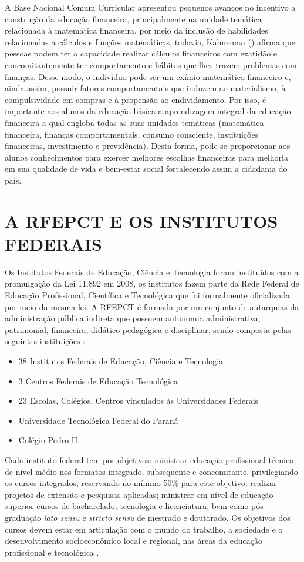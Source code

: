 A Base Nacional Comum Curricular apresentou pequenos avanços no incentivo a construção da educação financeira, principalmente na unidade temática relacionada à matemática financeira, por meio da inclusão de habilidades relacionadas a cálculos e funções matemáticas, todavia, Kahneman (\citeyear{kahneman2012}) afirma que pessoas podem ter a capacidade realizar cálculos financeiros com exatidão e concomitantemente ter comportamento e hábitos que lhes trazem problemas com finanças. Desse modo, o indivíduo pode ser um exímio matemático financeiro e, ainda assim, possuir fatores comportamentais que induzem ao materialismo, à compulsividade em compras e à propensão ao endividamento. Por isso, é importante aos alunos da educação básica a aprendizagem integral da educação financeira a qual engloba todas as suas unidades temáticas (matemática financeira, finanças comportamentais, consumo consciente, instituições financeiras, investimento e previdência). Desta forma, pode-se proporcionar aos alunos conhecimentos para exercer melhores escolhas financeiras para melhoria em sua qualidade de vida e bem-estar social fortalecendo assim a cidadania do país.

\section{A RFEPCT E OS INSTITUTOS FEDERAIS}
Os Institutos Federais de Educação, Ciência e Tecnologia foram instituídos com a promulgação da Lei 11.892 em 2008, os institutos fazem parte da Rede Federal de Educação Profissional, Científica e Tecnológica que foi formalmente oficializada por meio da mesma lei. A RFEPCT é formada por um conjunto de autarquias da administração pública indireta que possuem autonomia administrativa, patrimonial, financeira, didático-pedagógica e disciplinar, sendo composta pelas seguintes instituições \cite{brasil2008}:

\begin{itemize}
    \item 38 Institutos Federais de Educação, Ciência e Tecnologia
    \item 3 Centros Federais de Educação Tecnológica
    \item 23 Escolas, Colégios, Centros vinculados às Universidades Federais
    \item Universidade Tecnológica Federal do Paraná
    \item Colégio Pedro II
\end{itemize}

Cada instituto federal tem por objetivos: ministrar educação profissional técnica de nível médio nos formatos integrado, subsequente e concomitante, privilegiando os cursos integrados, reservando no mínimo 50\% para este objetivo; realizar projetos de extensão e pesquisas aplicadas; ministrar em nível de educação superior cursos de bacharelado, tecnologia e licenciatura, bem como pós-graduação \textit{lato sensu} e \textit{stricto sensu} de mestrado e doutorado. Os objetivos dos cursos devem estar em articulação com o mundo do trabalho, a sociedade e o desenvolvimento socioeconômico local e regional, nas áreas da educação profissional e tecnológica \cite{brasil2008}.

